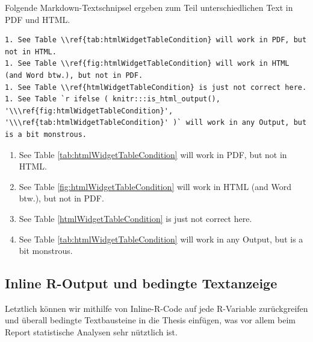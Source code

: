 \documentclass[]{book}
\makeatletter
\newenvironment{Shaded}{\begin{snugshade}}{\end{snugshade}}
\newcommand{\BaseNTok}[1]{\textcolor[rgb]{0.00,0.00,0.81}{{#1}}}
\newcommand{\NormalTok}[1]{{#1}}
\providecommand{\tightlist}{%
  \setlength{\itemsep}{0pt}\setlength{\parskip}{0pt}}
\newenvironment{kframe}{%
\medskip{}
\setlength{\fboxsep}{.8em}
 \def\at@end@of@kframe{}%
 \ifinner\ifhmode%
  \def\at@end@of@kframe{\end{minipage}}%
  \begin{minipage}{\columnwidth}%
 \fi\fi%
 \def\FrameCommand##1{\hskip\@totalleftmargin \hskip-\fboxsep
 \colorbox{shadecolor}{##1}\hskip-\fboxsep
     \hskip-\linewidth \hskip-\@totalleftmargin \hskip\columnwidth}%
 \MakeFramed {\advance\hsize-\width
   \@totalleftmargin\z@ \linewidth\hsize
   \@setminipage}}%
 {\par\unskip\endMakeFramed%
 \at@end@of@kframe}
\renewenvironment{Shaded}{\begin{kframe}}{\end{kframe}}
\theoremstyle{definition}
\theoremstyle{definition}
\theoremstyle{remark}
\makeatother
\begin{document}
Folgende Markdown-Textschnipsel ergeben zum Teil unterschiedlichen Text
in PDF und HTML.

\begin{verbatim}
1. See Table \\ref{tab:htmlWidgetTableCondition} will work in PDF, but not in HTML.
1. See Table \\ref{fig:htmlWidgetTableCondition} will work in HTML (and Word btw.), but not in PDF.
1. See Table \\ref{htmlWidgetTableCondition} is just not correct here.
1. See Table `r ifelse ( knitr:::is_html_output(), '\\\ref{fig:htmlWidgetTableCondition}', '\\\ref{tab:htmlWidgetTableCondition}' )` will work in any Output, but is a bit monstrous.
\end{verbatim}

\begin{enumerate}
\def\labelenumi{\arabic{enumi}.}
\tightlist
\item
  See Table \ref{tab:htmlWidgetTableCondition} will work in PDF, but not
  in HTML.
\item
  See Table \ref{fig:htmlWidgetTableCondition} will work in HTML (and
  Word btw.), but not in PDF.
\item
  See Table \ref{htmlWidgetTableCondition} is just not correct here.
\item
  See Table \ref{tab:htmlWidgetTableCondition} will work in any Output,
  but is a bit monstrous.
\end{enumerate}

\subsection{Inline R-Output und bedingte
Textanzeige}\label{inline-r-output-und-bedingte-textanzeige}

Letztlich können wir mithilfe von Inline-R-Code auf jede R-Variable
zurückgreifen und überall bedingte Textbausteine in die Thesis einfügen,
was vor allem beim Report statistische Analysen sehr nütztlich ist.

\begin{Shaded}
\end{Shaded}
\end{document}
